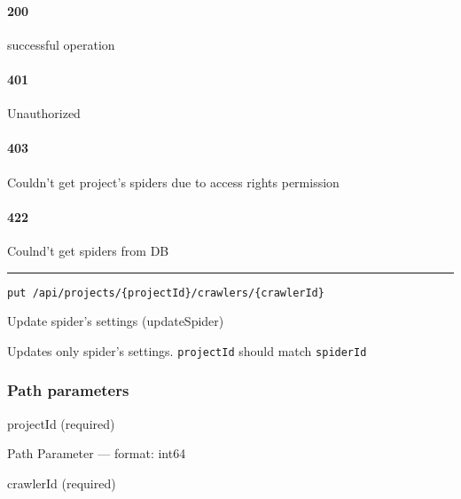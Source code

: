 \hypertarget{section-1}{%
\paragraph{200}\label{section-1}}

successful operation

\hypertarget{section-2}{%
\paragraph{401}\label{section-2}}

Unauthorized \protect\hyperlink{}{}

\hypertarget{section-3}{%
\paragraph{403}\label{section-3}}

Couldn't get project's spiders due to access rights permission
\protect\hyperlink{}{}

\hypertarget{section-4}{%
\paragraph{422}\label{section-4}}

Coulnd't get spiders from DB \protect\hyperlink{}{}

\begin{center}\rule{0.5\linewidth}{0.5pt}\end{center}

\protect\hypertarget{updateSpider}{}{}



\begin{verbatim}
put /api/projects/{projectId}/crawlers/{crawlerId}
\end{verbatim}

Update spider's settings ({updateSpider})

Updates only spider's settings. \texttt{projectId} should match
\texttt{spiderId}

\hypertarget{path-parameters-1}{%
\subsubsection*{Path parameters}\label{path-parameters-1}}

projectId (required)

{Path Parameter} --- format: int64

crawlerId (required)

